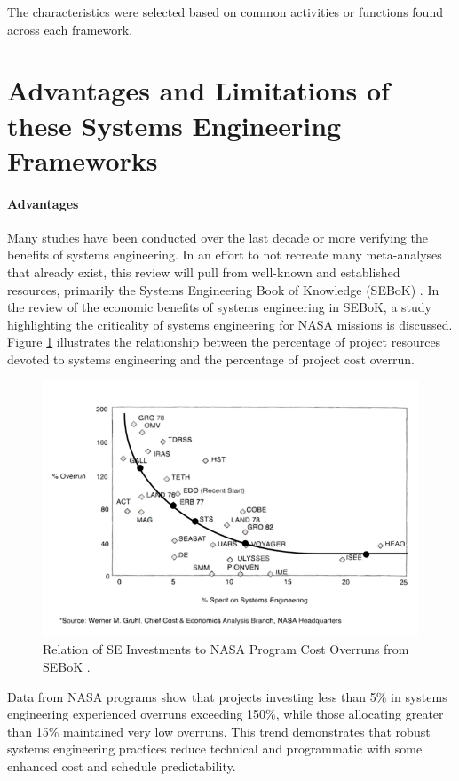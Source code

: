 The characteristics were selected based on common activities or functions found across each framework.

\section{Advantages and Limitations of these Systems Engineering Frameworks}
\label{sect:pros&cons}

\paragraph{Advantages}
Many studies have been conducted over the last decade or more verifying the benefits of systems engineering. In an effort to not recreate many meta-analyses that already exist, this review will pull from well-known and established resources, primarily the Systems Engineering Book of Knowledge (SEBoK) \cite{sebok_economic_value}. 
In the review of the economic benefits of systems engineering in SEBoK, a study highlighting the criticality of systems engineering for NASA missions is discussed. 
Figure \ref{fig:se_investments} illustrates the relationship between the percentage of project resources devoted to systems engineering and the percentage of project cost overrun\cite{sebok_economic_value}. \\
\begin{figure}[h!]
  \centering
  \includegraphics[width=0.7\linewidth]{figures/700px-NASA_Image_Part_1.png}
  \caption{Relation of SE Investments to NASA Program Cost Overruns from SEBoK
  \cite{sebok_economic_value}.}
  \label{fig:se_investments}
\end{figure}
Data from NASA programs show that projects investing less than 5\% in systems engineering experienced overruns exceeding 150\%, while those allocating greater than 15\% maintained very low overruns. 
This trend demonstrates that robust systems engineering practices reduce technical and programmatic with some enhanced cost and schedule predictability. 
